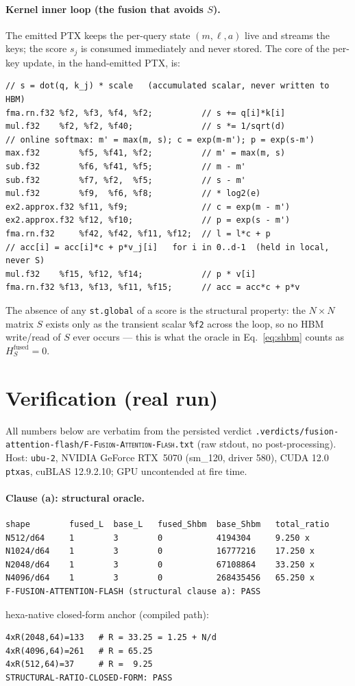 \documentclass[11pt,a4paper]{article}
\newcommand{\verdict}[1]{\texttt{#1}}
\newcommand{\falsifier}{\textsc{F-Fusion-Attention-Flash}}
\begin{document}
\paragraph{Kernel inner loop (the fusion that avoids $S$).}
The emitted PTX keeps the per-query state $(m,\ell,a)$ live and streams the keys;
the score $s_j$ is consumed immediately and never stored. The core of the
per-key update, in the hand-emitted PTX, is:
\begin{lstlisting}
// s = dot(q, k_j) * scale   (accumulated scalar, never written to HBM)
fma.rn.f32 %f2, %f3, %f4, %f2;          // s += q[i]*k[i]
mul.f32    %f2, %f2, %f40;              // s *= 1/sqrt(d)
// online softmax: m' = max(m, s); c = exp(m-m'); p = exp(s-m')
max.f32        %f5, %f41, %f2;          // m' = max(m, s)
sub.f32        %f6, %f41, %f5;          // m - m'
sub.f32        %f7, %f2,  %f5;          // s - m'
mul.f32        %f9,  %f6, %f8;          // * log2(e)
ex2.approx.f32 %f11, %f9;               // c = exp(m - m')
ex2.approx.f32 %f12, %f10;              // p = exp(s - m')
fma.rn.f32     %f42, %f42, %f11, %f12;  // l = l*c + p
// acc[i] = acc[i]*c + p*v_j[i]   for i in 0..d-1  (held in local, never S)
mul.f32    %f15, %f12, %f14;            // p * v[i]
fma.rn.f32 %f13, %f13, %f11, %f15;      // acc = acc*c + p*v
\end{lstlisting}
The absence of any \verdict{st.global} of a score is the structural property:
the $N\times N$ matrix $S$ exists only as the transient scalar \verdict{\%f2}
across the loop, so no HBM write/read of $S$ ever occurs --- this is what the
oracle in Eq.~\eqref{eq:shbm} counts as $H^{\mathrm{fused}}_S = 0$.

\section{Verification (real run)}
\label{sec:verification}

All numbers below are verbatim from the persisted verdict
\verdict{.verdicts/fusion-attention-flash/\falsifier{}.txt} (raw stdout, no
post-processing). Host: \verdict{ubu-2}, NVIDIA GeForce RTX~5070 (sm\_120,
driver 580), CUDA 12.0 \verdict{ptxas}, cuBLAS 12.9.2.10; GPU uncontended at
fire time.

\paragraph{Clause (a): structural oracle.}
\begin{lstlisting}
shape        fused_L  base_L   fused_Shbm  base_Shbm   total_ratio
N512/d64     1        3        0           4194304     9.250 x
N1024/d64    1        3        0           16777216    17.250 x
N2048/d64    1        3        0           67108864    33.250 x
N4096/d64    1        3        0           268435456   65.250 x
F-FUSION-ATTENTION-FLASH (structural clause a): PASS
\end{lstlisting}
hexa-native closed-form anchor (compiled path):
\begin{lstlisting}
4xR(2048,64)=133   # R = 33.25 = 1.25 + N/d
4xR(4096,64)=261   # R = 65.25
4xR(512,64)=37     # R =  9.25
STRUCTURAL-RATIO-CLOSED-FORM: PASS
\end{lstlisting}
\end{document}
